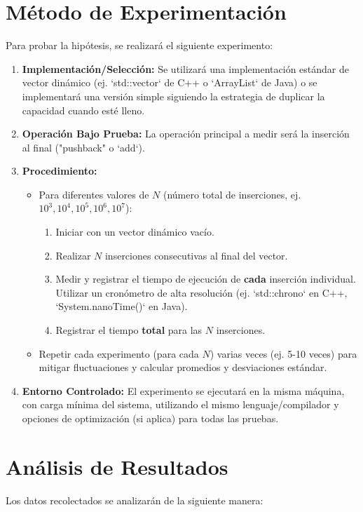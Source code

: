 \documentclass[11pt, a4paper]{article}
\begin{document}
\section{Método de Experimentación}
Para probar la hipótesis, se realizará el siguiente experimento:

\begin{enumerate}
    \item \textbf{Implementación/Selección:} Se utilizará una implementación estándar de vector dinámico (ej. `std::vector` de C++ o `ArrayList` de Java) o se implementará una versión simple siguiendo la estrategia de duplicar la capacidad cuando esté lleno.
    \item \textbf{Operación Bajo Prueba:} La operación principal a medir será la inserción al final ("pushback" o `add`).
    \item \textbf{Procedimiento:}
        \begin{itemize}
            \item Para diferentes valores de $N$ (número total de inserciones, ej. $10^3, 10^4, 10^5, 10^6, 10^7$):
                \begin{enumerate}
                    \item Iniciar con un vector dinámico vacío.
                    \item Realizar $N$ inserciones consecutivas al final del vector.
                    \item Medir y registrar el tiempo de ejecución de \textbf{cada} inserción individual. Utilizar un cronómetro de alta resolución (ej. `std::chrono` en C++, `System.nanoTime()` en Java).
                    \item Registrar el tiempo \textbf{total} para las $N$ inserciones.
                \end{enumerate}
            \item Repetir cada experimento (para cada $N$) varias veces (ej. 5-10 veces) para mitigar fluctuaciones y calcular promedios y desviaciones estándar.
        \end{itemize}
    \item \textbf{Entorno Controlado:} El experimento se ejecutará en la misma máquina, con carga mínima del sistema, utilizando el mismo lenguaje/compilador y opciones de optimización (si aplica) para todas las pruebas.
\end{enumerate}

\section{Análisis de Resultados}
Los datos recolectados se analizarán de la siguiente manera:
\end{document}
